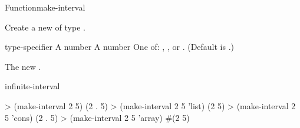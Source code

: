\documentclass[10pt,twoside,english,pdftex]{article}
\begin{document}
\begin{functiondoc}{Function}{make-interval}%
  {   
    \returns{} }
%
%

\fnsyntax

\fnpurpose Create a new  of type .

\fnpackage {}

\fnmodule {}

\fnargs
\begin{args}{type-specifier}
\arg[start] A number
\arg[end] A number
 One of: , , or .
  (Default is .)
\end{args}

\fnreturns The new .

\begin{alsos}{infinite-interval}
\end{alsos}

\fnexamples
%
\W\supp
\begin{example}
> (make-interval 2 5)
(2 . 5)
> (make-interval 2 5 'list)
(2 5)
> (make-interval 2 5 'cons)
(2 . 5)
> (make-interval 2 5 'array)
#(2 5)
\end{example}

\end{functiondoc}

\end{document}
